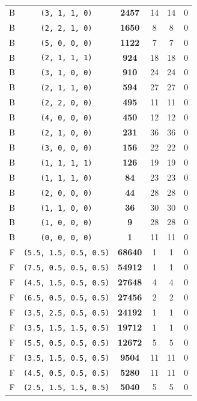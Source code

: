 \documentclass[11pt,a4paper]{article}
\begin{document}
\begin{longtable}{@{}cccccc@{}}
B & \texttt{(3, 1, 1, 0)} & \textbf{2457} & 14 & 14 & 0 \\
B & \texttt{(2, 2, 1, 0)} & \textbf{1650} & 8 & 8 & 0 \\
B & \texttt{(5, 0, 0, 0)} & \textbf{1122} & 7 & 7 & 0 \\
B & \texttt{(2, 1, 1, 1)} & \textbf{924} & 18 & 18 & 0 \\
B & \texttt{(3, 1, 0, 0)} & \textbf{910} & 24 & 24 & 0 \\
B & \texttt{(2, 1, 1, 0)} & \textbf{594} & 27 & 27 & 0 \\
B & \texttt{(2, 2, 0, 0)} & \textbf{495} & 11 & 11 & 0 \\
B & \texttt{(4, 0, 0, 0)} & \textbf{450} & 12 & 12 & 0 \\
B & \texttt{(2, 1, 0, 0)} & \textbf{231} & 36 & 36 & 0 \\
B & \texttt{(3, 0, 0, 0)} & \textbf{156} & 22 & 22 & 0 \\
B & \texttt{(1, 1, 1, 1)} & \textbf{126} & 19 & 19 & 0 \\
B & \texttt{(1, 1, 1, 0)} & \textbf{84} & 23 & 23 & 0 \\
B & \texttt{(2, 0, 0, 0)} & \textbf{44} & 28 & 28 & 0 \\
B & \texttt{(1, 1, 0, 0)} & \textbf{36} & 30 & 30 & 0 \\
B & \texttt{(1, 0, 0, 0)} & \textbf{9} & 28 & 28 & 0 \\
B & \texttt{(0, 0, 0, 0)} & \textbf{1} & 11 & 11 & 0 \\
F & \texttt{(5.5, 1.5, 0.5, 0.5)} & \textbf{68640} & 1 & 1 & 0 \\
F & \texttt{(7.5, 0.5, 0.5, 0.5)} & \textbf{54912} & 1 & 1 & 0 \\
F & \texttt{(4.5, 1.5, 0.5, 0.5)} & \textbf{27648} & 4 & 4 & 0 \\
F & \texttt{(6.5, 0.5, 0.5, 0.5)} & \textbf{27456} & 2 & 2 & 0 \\
F & \texttt{(3.5, 2.5, 0.5, 0.5)} & \textbf{24192} & 1 & 1 & 0 \\
F & \texttt{(3.5, 1.5, 1.5, 0.5)} & \textbf{19712} & 1 & 1 & 0 \\
F & \texttt{(5.5, 0.5, 0.5, 0.5)} & \textbf{12672} & 5 & 5 & 0 \\
F & \texttt{(3.5, 1.5, 0.5, 0.5)} & \textbf{9504} & 11 & 11 & 0 \\
F & \texttt{(4.5, 0.5, 0.5, 0.5)} & \textbf{5280} & 11 & 11 & 0 \\
F & \texttt{(2.5, 1.5, 1.5, 0.5)} & \textbf{5040} & 5 & 5 & 0 \\

\end{longtable}
\end{document}
